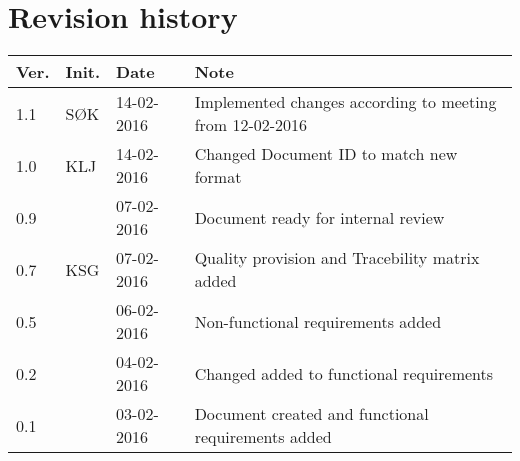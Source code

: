 \label{chp_revisionHistory}
\chapter{Revision history}

\begin{tabular}{b{1cm} b{1cm} b{2cm} b{8cm}}
    \textbf{Ver.} & \textbf{Init.} & \textbf{Date} & \textbf{Note} \\
    \hline
    1.1 & SØK & 14-02-2016 & Implemented changes according to meeting from 12-02-2016 \\ 
    1.0 & KLJ & 14-02-2016 & Changed Document ID to match new format \\
    0.9 &  & 07-02-2016 & Document ready for internal review \\
    0.7 & KSG & 07-02-2016 & Quality provision and Tracebility matrix added \\
    0.5 &  & 06-02-2016 & Non-functional requirements added \\
	0.2 &  & 04-02-2016 & Changed added to functional requirements \\
    0.1 &  & 03-02-2016 & Document created and functional requirements added  \\
\end{tabular}